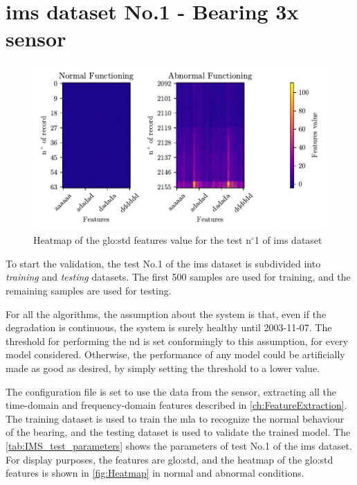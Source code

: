 \section{\gls{ims} dataset No.1 - Bearing 3x sensor}
\label{sec:ValidationOnRealWorldData}
\begin{figure}
    \centering
    \includegraphics{images/IMS/Heatmap.pdf}
    \caption{Heatmap of the \gls{glo:std} features value for the test $\text{n}^\circ$1 of \gls{ims} dataset}
    \label{fig:Heatmap}
\end{figure}


To start the validation, the test No.1 of the \gls{ims} dataset is subdivided into \emph{training} and \emph{testing} datasets. The first 500 samples are used for training, and the remaining samples are used for testing. 

For all the algorithms, the assumption about the system is that, even if the degradation is continuous, the system is surely healthy until 2003-11-07. The threshold for performing the \gls{nd} is set conformingly to this assumption, for every model considered. Otherwise, the performance of any model could be artificially made as good as desired, by simply setting the threshold to a lower value.

The configuration file is set to use the data from the  sensor, extracting all the time-domain and frequency-domain features described in \autoref{ch:FeatureExtraction}. The training dataset is used to train the \gls{mla} to recognize the normal behaviour of the bearing, and the testing dataset is used to validate the trained model. The \autoref{tab:IMS_test_parameters} shows the parameters of test No.1 of the \gls{ims} dataset. For display purposes, the features are \gls{glo:std}, and the heatmap of the \gls{glo:std} features is shown in \autoref{fig:Heatmap} in normal and abnormal conditions.

